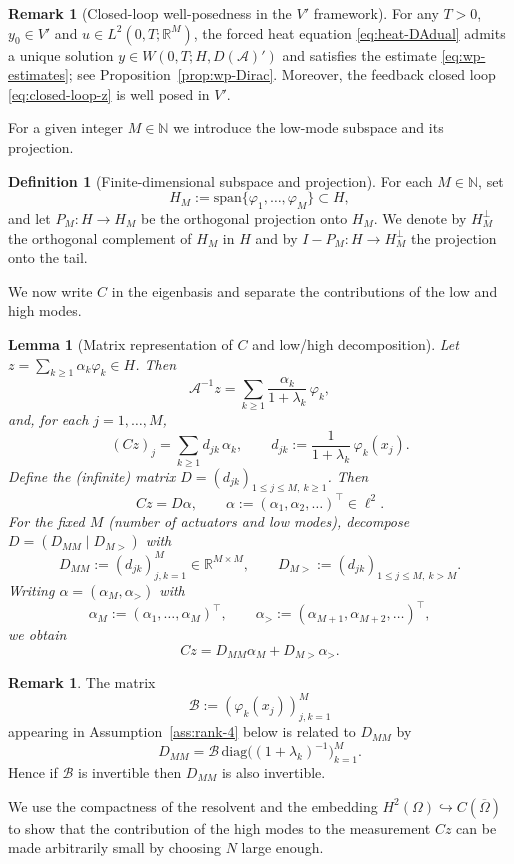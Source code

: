 \documentclass[11pt,a4paper]{article}
\numberwithin{equation}{section}
\newtheorem{lemma}[theorem]{Lemma}
\theoremstyle{definition}
\newtheorem{definition}[theorem]{Definition}
\newtheorem{remark}[theorem]{Remark}
\newcommand{\R}{\mathbb{R}}
\newcommand{\1}{\mathbbm{1}}
\begin{document}
\begin{remark}[Closed-loop well-posedness in the $V'$ framework]
\label{thm:closed-loop-wp}
For any $T>0$, $y_0\in V'$ and $u\in L^2(0,T;\R^M)$, the forced heat equation
\eqref{eq:heat-DAdual} admits a unique solution $y\in W(0,T;H,D(\mathcal A)')$ and satisfies the
estimate \eqref{eq:wp-estimates}; see Proposition~\ref{prop:wp-Dirac}.
Moreover, the feedback closed loop \eqref{eq:closed-loop-z} is well posed in $V'$.
\end{remark}
\noindent
For a given integer $M\in\mathbb{N}$ we introduce the low-mode subspace and
its projection.

\begin{definition}[Finite-dimensional subspace and projection]
\label{def:HM-PM-4}
For each $M\in\mathbb{N}$, set
\[
H_M := \mathrm{span}\{\varphi_1,\dots,\varphi_M\}\subset H,
\]
and let $P_M:H\to H_M$ be the orthogonal projection onto $H_M$. We denote
by $H_M^\perp$ the orthogonal complement of $H_M$ in $H$ and by
$I-P_M:H\to H_M^\perp$ the projection onto the tail.
\end{definition}
\noindent
We now write $C$ in the eigenbasis and separate the contributions of the low
and high modes.

\begin{lemma}[Matrix representation of $C$ and low/high decomposition]
\label{lem:C-matrix}
Let $z=\sum_{k\ge1}\alpha_k\varphi_k\in H$. Then
\[
\mathcal A^{-1}z = \sum_{k\ge1}\frac{\alpha_k}{1+\lambda_k}\,\varphi_k,
\]
and, for each $j=1,\dots,M$,
\[
(Cz)_j = \sum_{k\ge1} d_{jk}\,\alpha_k,\qquad
d_{jk} := \frac{1}{1+\lambda_k}\,\varphi_k(x_j).
\]
Define the (infinite) matrix $D=(d_{jk})_{1\le j\le M,\ k\ge1}$. Then
\[
Cz = D\alpha,\qquad \alpha:=(\alpha_1,\alpha_2,\dots)^\top\in\ell^2.
\]
For the fixed $M$ (number of actuators and low modes), decompose
$D=(D_{MM}\;|\;D_{M>})$ with
\[
D_{MM} := (d_{jk})_{j,k=1}^M\in\mathbb{R}^{M\times M},\qquad
D_{M>} := (d_{jk})_{1\le j\le M,\ k>M}.
\]
Writing $\alpha=(\alpha_M,\alpha_>)$ with
\[
\alpha_M := (\alpha_1,\dots,\alpha_M)^\top,\qquad
\alpha_> := (\alpha_{M+1},\alpha_{M+2},\dots)^\top,
\]
we obtain
\begin{equation}
\label{eq:Cz-split}
Cz = D_{MM}\alpha_M + D_{M>}\alpha_>.
\end{equation}
\end{lemma}

\begin{remark}
\label{rem:DMM-invertible}
The matrix
\[
\mathcal{B} := (\varphi_k(x_j))_{j,k=1}^M
\]
appearing in Assumption~\ref{ass:rank-4} below is related to $D_{MM}$ by
\[
D_{MM} = \mathcal{B}\,\mathrm{diag}\big((1+\lambda_k)^{-1}\big)_{k=1}^M.
\]
Hence if $\mathcal{B}$ is invertible then $D_{MM}$ is also invertible.
\end{remark}
\noindent
We use the compactness of the resolvent and the embedding $H^2(\Omega)\hookrightarrow C(\overline\Omega)$ to show that the contribution of the high modes to the measurement $Cz$ can be made arbitrarily small by choosing $N$ large enough.
\end{document}
